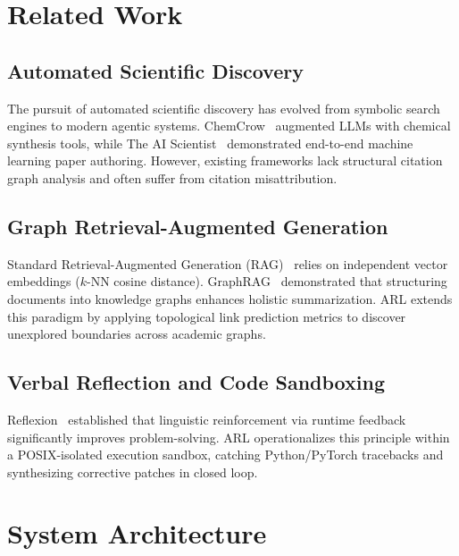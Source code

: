 \documentclass[10pt,twocolumn,letterpaper]{article}
\begin{document}
\section{Related Work}

\subsection{Automated Scientific Discovery}
The pursuit of automated scientific discovery has evolved from symbolic search engines to modern agentic systems. ChemCrow~\cite{bran2023chemcrow} augmented LLMs with chemical synthesis tools, while The AI Scientist~\cite{lu2024aiscientist} demonstrated end-to-end machine learning paper authoring. However, existing frameworks lack structural citation graph analysis and often suffer from citation misattribution.

\subsection{Graph Retrieval-Augmented Generation}
Standard Retrieval-Augmented Generation (RAG)~\cite{lewis2020retrieval} relies on independent vector embeddings ($k$-NN cosine distance). GraphRAG~\cite{edge2024graphrag} demonstrated that structuring documents into knowledge graphs enhances holistic summarization. ARL extends this paradigm by applying topological link prediction metrics to discover unexplored boundaries across academic graphs.

\subsection{Verbal Reflection and Code Sandboxing}
Reflexion~\cite{shinn2023reflexion} established that linguistic reinforcement via runtime feedback significantly improves problem-solving. ARL operationalizes this principle within a POSIX-isolated execution sandbox, catching Python/PyTorch tracebacks and synthesizing corrective patches in closed loop.

\section{System Architecture}
\label{sec:architecture}
\end{document}
